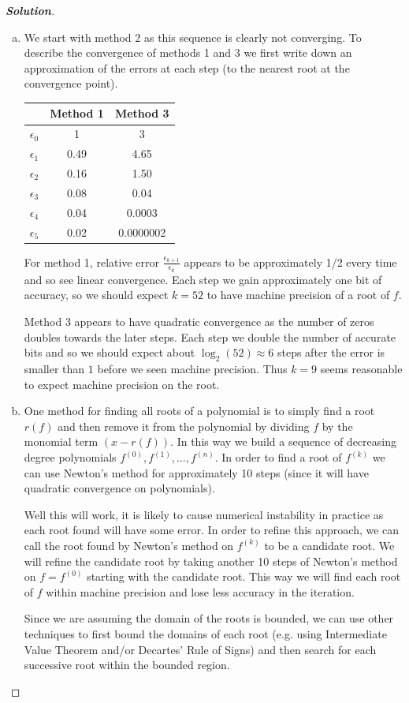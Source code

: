 \documentclass[11pt]{article}
\newenvironment{solution}{%
  \begin{proof}[\textbf{Solution}]$ $\par\nobreak\ignorespaces
}{%
  \end{proof}
}
\theoremstyle{definition}
\begin{document}
\begin{solution}
\begin{enumerate}[(a)]
    \item We start with method 2 as this sequence is clearly not converging. To describe the convergence of methods 1 and 3 we first write down an approximation of the errors at each step (to the nearest root at the convergence point).
    
    \begin{tabular}{c|c|c}
        & Method 1 & Method 3 \\\hline
        $\epsilon_0$ & 1 & 3 \\
        $\epsilon_1$ & 0.49 & 4.65 \\
        $\epsilon_2$ & 0.16 & 1.50 \\
        $\epsilon_3$ & 0.08 & 0.04 \\
        $\epsilon_4$ & 0.04 & 0.0003 \\
        $\epsilon_5$ & 0.02 & 0.0000002
    \end{tabular}
    
    For method 1, relative error $\frac{\epsilon_{k+1}}{\epsilon_k}$ appears to be approximately 1/2 every time and so see linear convergence. Each step we gain approximately one bit of accuracy, so we should expect $k = 52$ to have machine precision of a root of $f$.
    
    Method 3 appears to have quadratic convergence as the number of zeros doubles towards the later steps. Each step we double the number of accurate bits and so we should expect about $\log_2(52) \approx 6$ steps after the error is smaller than $1$ before we seen machine precision. Thus $k = 9$ seems reasonable to expect machine precision on the root.
    \item One method for finding all roots of a polynomial is to simply find a root $r(f)$ and then remove it from the polynomial by dividing $f$ by the monomial term $(x - r(f))$. In this way we build a sequence of decreasing degree polynomials $f^{(0)}, f^{(1)}, \ldots, f^{(n)}$. In order to find a root of $f^{(k)}$ we can use Newton's method for approximately 10 steps (since it will have quadratic convergence on polynomials).
    
    Well this will work, it is likely to cause numerical instability in practice as each root found will have some error. In order to refine this approach, we can call the root found by Newton's method on $f^{(k)}$ to be a candidate root. We will refine the candidate root by taking another 10 steps of Newton's method on $f = f^{(0)}$ starting with the candidate root. This way we will find each root of $f$ within machine precision and lose less accuracy in the iteration.

    Since we are assuming the domain of the roots is bounded, we can use other techniques to first bound the domains of each root (e.g. using Intermediate Value Theorem and/or Decartes' Rule of Signs) and then search for each successive root within the bounded region.
\end{enumerate}
\end{solution}
\end{document}
